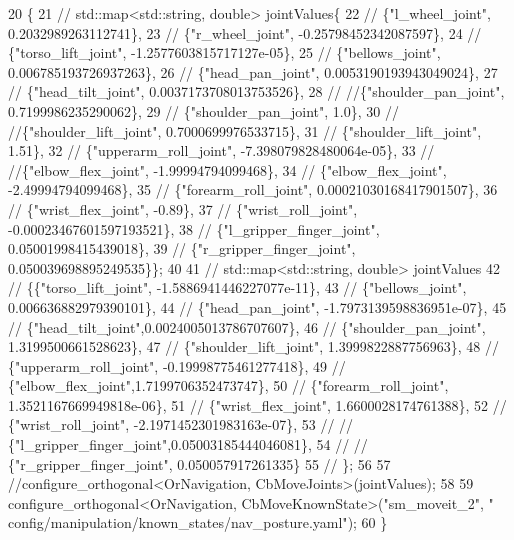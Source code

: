 \begin{DoxyCode}
20     \{
21     \textcolor{comment}{//    std::map<std::string, double> jointValues\{}
22     \textcolor{comment}{//         \{"l\_wheel\_joint", 0.2032989263112741\},}
23     \textcolor{comment}{//         \{"r\_wheel\_joint", -0.25798452342087597\},}
24     \textcolor{comment}{//         \{"torso\_lift\_joint", -1.2577603815717127e-05\},}
25     \textcolor{comment}{//         \{"bellows\_joint", 0.006785193726937263\},}
26     \textcolor{comment}{//         \{"head\_pan\_joint", 0.0053190193943049024\},}
27     \textcolor{comment}{//         \{"head\_tilt\_joint", 0.0037173708013753526\},}
28     \textcolor{comment}{//         //\{"shoulder\_pan\_joint", 0.7199986235290062\},}
29     \textcolor{comment}{//         \{"shoulder\_pan\_joint", 1.0\},}
30     \textcolor{comment}{//         //\{"shoulder\_lift\_joint", 0.7000699976533715\},}
31     \textcolor{comment}{//         \{"shoulder\_lift\_joint", 1.51\},}
32     \textcolor{comment}{//         \{"upperarm\_roll\_joint", -7.398079828480064e-05\},}
33     \textcolor{comment}{//         //\{"elbow\_flex\_joint", -1.99994794099468\},}
34     \textcolor{comment}{//         \{"elbow\_flex\_joint", -2.49994794099468\},}
35     \textcolor{comment}{//         \{"forearm\_roll\_joint", 0.00021030168417901507\},}
36     \textcolor{comment}{//         \{"wrist\_flex\_joint", -0.89\},}
37     \textcolor{comment}{//         \{"wrist\_roll\_joint", -0.00023467601597193521\},}
38     \textcolor{comment}{//         \{"l\_gripper\_finger\_joint", 0.05001998415439018\},}
39     \textcolor{comment}{//         \{"r\_gripper\_finger\_joint", 0.050039698895249535\}\};}
40 
41     \textcolor{comment}{//  std::map<std::string, double> jointValues}
42     \textcolor{comment}{//    \{\{"torso\_lift\_joint", -1.5886941446227077e-11\},}
43     \textcolor{comment}{//     \{"bellows\_joint", 0.006636882979390101\},}
44     \textcolor{comment}{//     \{"head\_pan\_joint", -1.7973139598836951e-07\},}
45     \textcolor{comment}{//     \{"head\_tilt\_joint",0.0024005013786707607\},}
46     \textcolor{comment}{//     \{"shoulder\_pan\_joint", 1.3199500661528623\},}
47     \textcolor{comment}{//     \{"shoulder\_lift\_joint", 1.3999822887756963\},}
48     \textcolor{comment}{//     \{"upperarm\_roll\_joint", -0.19998775461277418\},}
49     \textcolor{comment}{//     \{"elbow\_flex\_joint",1.7199706352473747\},}
50     \textcolor{comment}{//     \{"forearm\_roll\_joint", 1.3521167669949818e-06\},}
51     \textcolor{comment}{//     \{"wrist\_flex\_joint", 1.6600028174761388\},}
52     \textcolor{comment}{//     \{"wrist\_roll\_joint", -2.1971452301983163e-07\},}
53     \textcolor{comment}{//     // \{"l\_gripper\_finger\_joint",0.05003185444046081\},}
54     \textcolor{comment}{//     // \{"r\_gripper\_finger\_joint", 0.050057917261335\}}
55     \textcolor{comment}{//     \};}
56 
57         \textcolor{comment}{//configure\_orthogonal<OrNavigation, CbMoveJoints>(jointValues);}
58 
59         configure\_orthogonal<OrNavigation, CbMoveKnownState>(\textcolor{stringliteral}{"sm\_moveit\_2"}, \textcolor{stringliteral}{"
      config/manipulation/known\_states/nav\_posture.yaml"});
60     \}
\end{DoxyCode}


